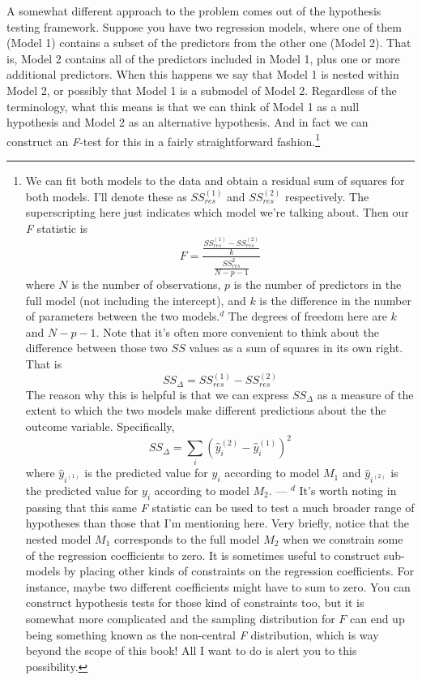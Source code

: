 \documentclass[
  a4paper,
]{book}
\begin{document}
A somewhat different approach to the problem comes out of the hypothesis
testing framework. Suppose you have two regression models, where one of
them (Model 1) contains a subset of the predictors from the other one
(Model 2). That is, Model 2 contains all of the predictors included in
Model 1, plus one or more additional predictors. When this happens we
say that Model 1 is nested within Model 2, or possibly that Model 1 is a
submodel of Model 2. Regardless of the terminology, what this means is
that we can think of Model 1 as a null hypothesis and Model 2 as an
alternative hypothesis. And in fact we can construct an \emph{F}-test
for this in a fairly straightforward fashion.\footnote{We can fit both
  models to the data and obtain a residual sum of squares for both
  models. I'll denote these as \(SS_{res}^{(1)}\) and \(SS_{res}^{(2)}\)
  respectively. The superscripting here just indicates which model we're
  talking about. Then our \emph{F} statistic is
  \[F= \frac {\frac {SS _{res}^{(1)} - SS_{res}^{(2)}} {k}}   {\frac{SS_{res}^2} {N-p-1} }\]
  where \(N\) is the number of observations, \(p\) is the number of
  predictors in the full model (not including the intercept), and \(k\)
  is the difference in the number of parameters between the two
  models.\(^d\) The degrees of freedom here are \(k\) and \(N -p-1\).
  Note that it's often more convenient to think about the difference
  between those two \(SS\) values as a sum of squares in its own right.
  That is \[SS_\Delta=SS_{res}^{(1)}-SS_{res}^{(2)}\] The reason why
  this is helpful is that we can express \(SS_\Delta\) as a measure of
  the extent to which the two models make different predictions about
  the the outcome variable. Specifically,
  \[SS_\Delta=\sum_i{(\hat{y}_i^{(2)}-\hat{y}_i^{(1)})^2}\] where
  \(\hat{y}_{i^{(1)}}\) is the predicted value for \(y_i\) according to
  model \(M_1\) and \(\hat{y}_{i^{(2)}}\) is the predicted value for
  \(y_i\) according to model \(M_2\). --- \(^d\) It's worth noting in
  passing that this same \emph{F} statistic can be used to test a much
  broader range of hypotheses than those that I'm mentioning here. Very
  briefly, notice that the nested model \(M_1\) corresponds to the full
  model \(M_2\) when we constrain some of the regression coefficients to
  zero. It is sometimes useful to construct sub-models by placing other
  kinds of constraints on the regression coefficients. For instance,
  maybe two different coefficients might have to sum to zero. You can
  construct hypothesis tests for those kind of constraints too, but it
  is somewhat more complicated and the sampling distribution for \(F\)
  can end up being something known as the non-central \emph{F}
  distribution, which is way beyond the scope of this book! All I want
  to do is alert you to this possibility.}
\end{document}
